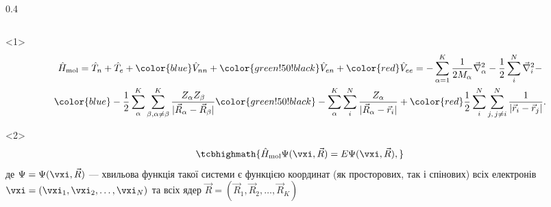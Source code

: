 \documentclass[]{beamer}
\begin{document}
\begin{frame}[t]
\begin{columns}
\begin{column}{0.4\linewidth}
\begin{onlyenv}
			\end{onlyenv}
		\end{column}
	\end{columns}
	\begin{onlyenv}
		\begin{multline*}
			\hat{H}_\mathrm{mol} =
			\hat{T}_{n} +
			\hat{T}_{e} +
			{\color{blue} \hat{V}_{nn}} +
			{\color{green!50! black} \tiny \hat{V}_{en}} +
			{\color{red} \hat{V}_{ee}}
			=  - \sum\limits_{\alpha =1}^{K} \frac{1}{2M_{\alpha}} \vec{\nabla}^2_{\alpha}
			-\frac12 \sum\limits_{i}^{N} \vec{\nabla}^2_i  -\\
			{\color{blue}  -\frac12\sum\limits_{\alpha}^{K}\sum\limits_{\beta, \alpha\neq\beta}^{K} \frac{Z_{\alpha}Z_{\beta}}{|\vec{R}_{\alpha}
			- \vec{R}_{\beta}|}}
			{\color{green!50!black} -\sum\limits_{\alpha}^{K}\sum\limits_{i}^{N} \frac{Z_{\alpha}}{|\vec{R}_{\alpha} - \vec{r}_i|}} +
			{\color{red} \frac12 \sum\limits_{i}^{N}\sum\limits_{\substack{j,\, j \neq i}}^{N}\frac{1}{|\vec{r}_i - \vec{r}_j|}}.
		\end{multline*}
	\end{onlyenv}
	\begin{onlyenv}
		\begin{equation*}\label{*}
			\tcbhighmath{\hat{H}_\mathrm{mol} \Psi(\vxi, \vec{R}) = E \Psi(\vxi, \vec{R}),}
		\end{equation*}
		де $\Psi = \Psi(\vxi, \vec{R})$ --- хвильова функція такої системи є функцією координат (як просторових, так і спінових) всіх елек\-тронів  $\vxi = (\vxi_1, \vxi_2, \ldots, \vxi_N)$  та всіх ядер  $\vec{R} = (\vec{R}_1, \vec{R}_2, \ldots, \vec{R}_K)$
	\end{onlyenv}
\end{frame}

\end{document}
